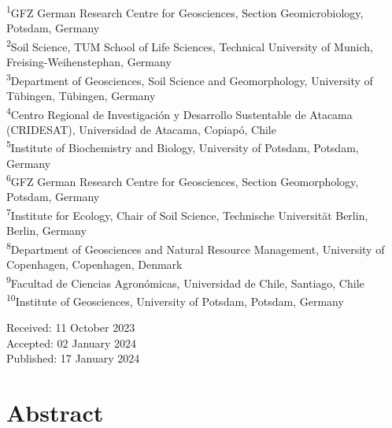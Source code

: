   \begin{scriptsize}
    \begin{justify}
    
      \textsuperscript{1}GFZ German Research Centre for Geosciences, Section Geomicrobiology, Potsdam, Germany\\
      \textsuperscript{2}Soil Science, TUM School of Life Sciences, Technical University of Munich, Freising-Weihenstephan, Germany\\
      \textsuperscript{3}Department of Geosciences, Soil Science and Geomorphology, University of T{\"u}bingen, T{\"u}bingen, Germany\\
      \textsuperscript{4}Centro Regional de Investigaci{\'o}n y Desarrollo Sustentable de Atacama (CRIDESAT), Universidad de Atacama, Copiap{\'o}, Chile\\
      \textsuperscript{5}Institute of Biochemistry and Biology, University of Potsdam, Potsdam, Germany\\
      \textsuperscript{6}GFZ German Research Centre for Geosciences, Section Geomorphology, Potsdam, Germany\\
      \textsuperscript{7}Institute for Ecology, Chair of Soil Science, Technische Universit{\"a}t Berlin, Berlin, Germany\\
      \textsuperscript{8}Department of Geosciences and Natural Resource Management, University of Copenhagen, Copenhagen, Denmark\\
      \textsuperscript{9}Facultad de Ciencias Agron{\'o}micas, Universidad de Chile, Santiago, Chile\\
      \textsuperscript{10}Institute of Geosciences, University of Potsdam, Potsdam, Germany

    \end{justify}
  \end{scriptsize}
    
  \vspace{0.5cm}
  \begin{center}
    Received: 11 October 2023\\
    Accepted: 02 January 2024\\
    Published: 17 January 2024
  \end{center}
  \cleardoublepage
  
\section*{Abstract} %

